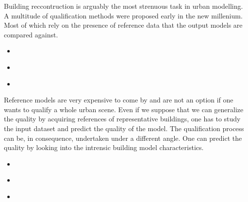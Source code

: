 \documentclass[../main.tex]{subfiles}
\begin{document}
    Building reccontruction is arguably the most strenuous task in urban modelling. A multitude of qualification methods were proposed early in the new millenium. Most of which rely on the presence of reference data that the output models are compared against.
    \begin{itemize}
        \item ~\cite{Akca2010}
        \item ~\cite{Zeng2014}
        \item ~\cite{Kaartinen2005}
    \end{itemize}
    Reference models are very expensive to come by and are not an option if one wants to qualify a whole urban scene. Even if we suppose that we can generalize the quality by acquiring references of representative buildings, one has to study the input dataset and predict the quality of the model. The qualification process can be, in consequence, undertaken under a different angle. One can predict the quality by looking into the intrensic building model characteristics.
    \begin{itemize}
        \item ~\cite{OudeElberink2010}
        \item ~\cite{Boudet2006}
        \item ~\cite{michelin2013quality}
    \end{itemize}
\end{document}
